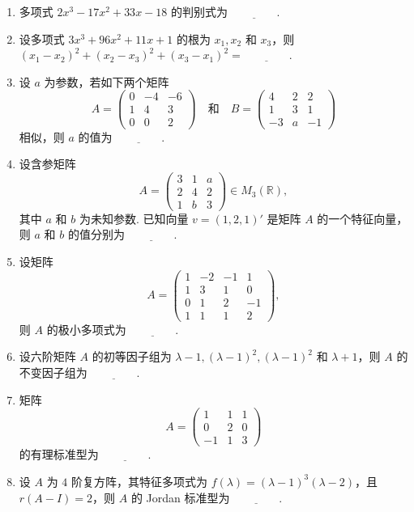 \begin{enumerate}
    \item 多项式 $2x^3 - 17x^2 + 33x - 18$ 的判别式为 $\underline{\qquad\qquad}$.

    \item 设多项式 $3x^3 + 96x^2 + 11x + 1$ 的根为 $x_1, x_2$ 和 $x_3$，则 $(x_1 - x_2)^2 + (x_2 - x_3)^2 + (x_3 - x_1)^2 = \underline{\qquad\qquad}$.

    \item 设 $a$ 为参数，若如下两个矩阵
    $$A = \begin{pmatrix}
        0 & -4 & -6 \\
        1 & 4 & 3 \\
        0 & 0 & 2
    \end{pmatrix} \quad \text{和} \quad B = \begin{pmatrix}
        4 & 2 & 2 \\
        1 & 3 & 1 \\
        -3 & a & -1
    \end{pmatrix}$$
    相似，则 $a$ 的值为 $\underline{\qquad\qquad}$.

    \item 设含参矩阵
    $$A = \begin{pmatrix}
        3 & 1 & a \\
        2 & 4 & 2 \\
        1 & b & 3
    \end{pmatrix} \in M_3(\mathbb{R}),$$
    其中 $a$ 和 $b$ 为未知参数. 已知向量 $v = (1, 2, 1)'$ 是矩阵 $A$ 的一个特征向量，则 $a$ 和 $b$ 的值分别为 $\underline{\qquad\qquad}$.

    \item 设矩阵 
    $$A = \begin{pmatrix}
        1 & -2 & -1 & 1 \\
        1 & 3 & 1 & 0 \\
        0 & 1 & 2 & -1 \\
        1 & 1 & 1 & 2
    \end{pmatrix},$$ 
    则 $A$ 的极小多项式为 $\underline{\qquad\qquad}$.

    \item 设六阶矩阵 $A$ 的初等因子组为 $\lambda - 1, (\lambda - 1)^2, (\lambda - 1)^2$ 和 $\lambda + 1$，则 $A$ 的不变因子组为 $\underline{\qquad\qquad}$.

    \item 矩阵 
    $$A = \begin{pmatrix}
        1 & 1 & 1 \\
        0 & 2 & 0 \\
        -1 & 1 & 3
    \end{pmatrix}$$ 
    的有理标准型为 $\underline{\qquad\qquad}$.

    \item 设 $A$ 为 $4$ 阶复方阵，其特征多项式为 $f(\lambda) = (\lambda - 1)^3(\lambda - 2)$，且 $r(A - I) = 2$，则 $A$ 的 Jordan 标准型为 $\underline{\qquad\qquad}$.
\end{enumerate}

